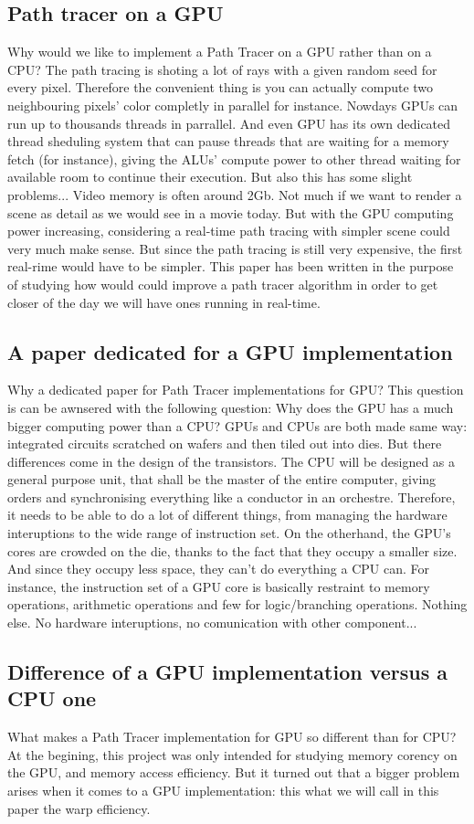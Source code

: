 \subsection{Path tracer on a GPU}
Why would we like to implement a Path Tracer on a GPU rather than on a CPU?
The path tracing is shoting a lot of rays with a given random seed
for every pixel. Therefore the convenient thing is you can actually
compute two neighbouring pixels' color completly in parallel for instance.
Nowdays GPUs can run up to thousands threads in parrallel. And even GPU has
its own dedicated thread sheduling system that can pause threads that are
waiting for a memory fetch (for instance), giving the ALUs' compute power to
other thread waiting for available room to continue their execution. But also
this has some slight problems... Video memory is often around 2Gb. Not much if
we want to render a scene as detail as we would see in a movie today. But with
the GPU computing power increasing, considering a real-time path tracing with
simpler scene could very much make sense. But since the path tracing is still
very expensive, the first real-rime would have to be simpler. This paper has
been written in the purpose of studying how would could improve a path tracer
algorithm in order to get closer of the day we will have ones running in
real-time.

\subsection{A paper dedicated for a GPU implementation}
Why a dedicated paper for Path Tracer implementations for GPU? This question is
can be awnsered with the following question: Why does the GPU has a much bigger
computing power than a CPU? GPUs and CPUs are both made same way:
integrated circuits scratched on wafers and then tiled out
into dies. But there differences come in the design of the transistors. The CPU
will be designed as a general purpose unit, that shall be the master of the
entire computer, giving orders and synchronising everything like a conductor
in an orchestre. Therefore, it needs to be able to do a lot of
different things, from managing the hardware interuptions to the wide range of
instruction set. On the otherhand, the GPU's cores are crowded on the die, thanks
to the fact that
they occupy a smaller size. And since they occupy less space, they
can't do everything a CPU can. For instance, the instruction set of a GPU core
is basically restraint to memory
operations, arithmetic operations and few for logic/branching operations. Nothing else.
No hardware interuptions, no comunication with other component...

\subsection{Difference of a GPU implementation versus a CPU one}
What makes a Path Tracer implementation for GPU so different than for CPU? At
the begining, this project was only intended for studying memory corency on the
GPU, and memory access efficiency.
But it turned out that a bigger problem arises when it comes to a GPU
implementation: this what we will call in this paper the warp efficiency.
